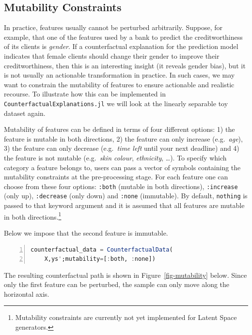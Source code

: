 \documentclass{juliacon}
\begin{document}
\hypertarget{mutability-constraints}{%
\subsection{Mutability Constraints}\label{mutability-constraints}}

In practice, features usually cannot be perturbed arbitrarily. Suppose,
for example, that one of the features used by a bank to predict the
creditworthiness of its clients is \emph{gender}. If a counterfactual
explanation for the prediction model indicates that female clients
should change their gender to improve their creditworthiness, then this
is an interesting insight (it reveals gender bias), but it is not
usually an actionable transformation in practice. In such cases, we may
want to constrain the mutability of features to ensure actionable and
realistic recourse. To illustrate how this can be implemented in
\texttt{CounterfactualExplanations.jl} we will look at the linearly
separable toy dataset again.

Mutability of features can be defined in terms of four different
options: 1) the feature is mutable in both directions, 2) the feature
can only increase (e.g.~\emph{age}), 3) the feature can only decrease
(e.g.~\emph{time left} until your next deadline) and 4) the feature is
not mutable (e.g.~\emph{skin colour}, \emph{ethnicity}, \ldots). To
specify which category a feature belongs to, users can pass a vector of
symbols containing the mutability constraints at the pre-processing
stage. For each feature one can choose from these four options:
\texttt{:both} (mutable in both directions), \texttt{:increase} (only
up), \texttt{:decrease} (only down) and \texttt{:none} (immutable). By
default, \texttt{nothing} is passed to that keyword argument and it is
assumed that all features are mutable in both directions.\footnote{Mutability
  constraints are currently not yet implemented for Latent Space
  generators.}

Below we impose that the second feature is immutable.

\begin{lstlisting}[language=Julia, escapechar=@, numbers=left, label={lst:mutability}, caption={}]
counterfactual_data = CounterfactualData(
    X,ys';mutability=[:both, :none])
\end{lstlisting}

The resulting counterfactual path is shown in
Figure~\ref{fig-mutability} below. Since only the first feature can be
perturbed, the sample can only move along the horizontal axis.
\end{document}

